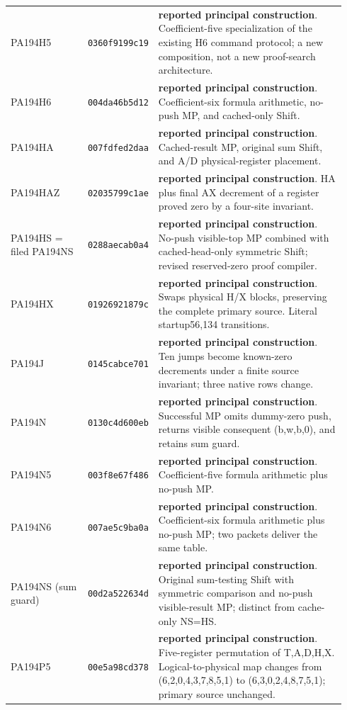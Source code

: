 {\begin{longtable}{@{}>{\raggedright\arraybackslash}p{0.23\linewidth}>{\raggedright\arraybackslash}p{0.145\linewidth}>{\raggedright\arraybackslash}p{0.56\linewidth}@{}}
PA194H5 & \texttt{0360f9199c19} & \textbf{reported principal construction}. Coefficient-five specialization of the existing H6 command protocol; a new composition, not a new proof-search architecture.\\[4pt]
PA194H6 & \texttt{004da46b5d12} & \textbf{reported principal construction}. Coefficient-six formula arithmetic, no-push MP, and cached-only Shift.\\[4pt]
PA194HA & \texttt{007fdfed2daa} & \textbf{reported principal construction}. Cached-result MP, original sum Shift, and A/D physical-register placement.\\[4pt]
PA194HAZ & \texttt{02035799c1ae} & \textbf{reported principal construction}. HA plus final AX decrement of a register proved zero by a four-site invariant.\\[4pt]
PA194HS = filed PA194NS & \texttt{0288aecab0a4} & \textbf{reported principal construction}. No-push visible-top MP combined with cached-head-only symmetric Shift; revised reserved-zero proof compiler.\\[4pt]
PA194HX & \texttt{01926921879c} & \textbf{reported principal construction}. Swaps physical H/X blocks, preserving the complete primary source. Literal startup56,134 transitions.\\[4pt]
PA194J & \texttt{0145cabce701} & \textbf{reported principal construction}. Ten jumps become known-zero decrements under a finite source invariant; three native rows change.\\[4pt]
PA194N & \texttt{0130c4d600eb} & \textbf{reported principal construction}. Successful MP omits dummy-zero push, returns visible consequent (b,w,b,0), and retains sum guard.\\[4pt]
PA194N5 & \texttt{003f8e67f486} & \textbf{reported principal construction}. Coefficient-five formula arithmetic plus no-push MP.\\[4pt]
PA194N6 & \texttt{007ae5c9ba0a} & \textbf{reported principal construction}. Coefficient-six formula arithmetic plus no-push MP; two packets deliver the same table.\\[4pt]
PA194NS (sum guard) & \texttt{00d2a522634d} & \textbf{reported principal construction}. Original sum-testing Shift with symmetric comparison and no-push visible-result MP; distinct from cache-only NS=HS.\\[4pt]
PA194P5 & \texttt{00e5a98cd378} & \textbf{reported principal construction}. Five-register permutation of T,A,D,H,X. Logical-to-physical map changes from (6,2,0,4,3,7,8,5,1) to (6,3,0,2,4,8,7,5,1); primary source unchanged.\\[4pt]

\end{longtable}}
